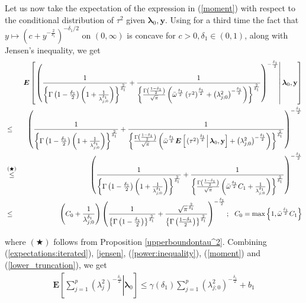 \documentclass[noinfoline,11pt]{imsart}
\numberwithin{equation}{section}
\theoremstyle{plain}
\newcommand{\bl}{\boldsymbol{\lambda}}
\newcommand{\E}{\boldsymbol{E}}
\begin{document}
  \noindent
  Let us now take the expectation of the expression in (\ref{moment}) with respect to the conditional distribution of $\tau^2$ given $\mathbf{\bl}_0, \mathbf{y}$. Using for a third time the fact that $y\mapsto\left(c+y^{-\frac{2}{\delta_1}}\right)^{-\delta_1/2}$ on $(0,\infty)$ is concave for $c > 0, \delta_1 \in (0,1)$, along with  Jensen's inequality, we get
  \begin{eqnarray}
   & & \E\left[\left.\left(\frac{1}{\left\{\Gamma\left(1-\frac{\delta_1}{2}\right)\left(1+\frac{1}{\lambda_{j;0}^{\delta_1}}\right)\right\}^{\frac{2}{\delta_1}}}+\frac{1}{\left\{\frac{\Gamma\left(\frac{1-\delta_1}{2}\right)}{\sqrt{\pi}}\left(\bar{\omega}^{\frac{\delta_1}{2}}\left(\tau^2\right)^{\frac{\delta_1}{2}}+\left(\lambda_{j;0}^2\right)^{-\frac{\delta_1}{2}}\right)\right\}^{\frac{2}{\delta_1}}}\right)^{-\frac{\delta_1}{2}}\right|\mathbf{\bl}_0,\mathbf{y}\right] \nonumber \\
   &\leq& \left(\frac{1}{\left\{\Gamma\left(1-\frac{\delta_1}{2}\right)\left(1+\frac{1}{\lambda_{j;0}^{\delta_1}}\right)\right\}^{\frac{2}{\delta_1}}}+\frac{1}{\left\{\frac{\Gamma\left(\frac{1-\delta_1}{2}\right)}{\sqrt{\pi}}\left(\bar{\omega}^{\frac{\delta_1}{2}}\E\left[\left.\left(\tau^2\right)^{\frac{\delta_1}{2}}\right|\mathbf{\bl}_0,\mathbf{y}\right]+\left(\lambda_{j;0}^2\right)^{-\frac{\delta_1}{2}}\right)\right\}^{\frac{2}{\delta_1}}}\right)^{-\frac{\delta_1}{2}} \nonumber \allowdisplaybreaks\\
   &\overset{(\bigstar)}{\leq}&  \left(\frac{1}{\left\{\Gamma\left(1-\frac{\delta_1}{2}\right)\left(1+\frac{1}{\lambda_{j;0}^{\delta_1}}\right)\right\}^{\frac{2}{\delta_1}}}+\frac{1}{\left\{\frac{\Gamma\left(\frac{1-\delta_1}{2}\right)}{\sqrt{\pi}}\left(\bar{\omega}^{\frac{\delta_1}{2}}C_1+\frac{1}{\lambda_{j;0}^{\delta_1}}\right)\right\}^{\frac{2}{\delta_1}}}\right)^{-\frac{\delta_1}{2}} \nonumber \\
  &\leq& \left(C_0+\frac{1}{\lambda_{j;0}^{\delta_1}}\right)\left(\frac{1}{\left\{\Gamma\left(1-\frac{\delta_1}{2}\right)\right\}^{\frac{2}{\delta_1}}}+\frac{\sqrt{\pi}^{\frac{2}{\delta_1}}}{\left\{\Gamma\left(\frac{1-\delta_1}{2}\right)\right\}^{\frac{2}{\delta_1}}}\right)^{-\frac{\delta_1}{2}};\ \ C_0=\text{max}\left\{1,\bar{\omega}^{\frac{\delta_1}{2}}C_1\right\} \label{lower_truncation}
\end{eqnarray}

\noindent
where $(\bigstar)$ follows from Proposition \ref{upperboundontau^2}. Combining (\ref{expectations:iterated}), \eqref{jensen},  (\ref{power:inequality}), 
(\ref{moment}) and (\ref{lower_truncation}), we get 
\begin{eqnarray}\label{drift:1}
   \E\left[\left.\sum_{j=1}^p\left(\lambda_j^2\right)^{-\frac{\delta_1}{2}}\right|\mathbf{\bl}_0\right]\leq \gamma\left(\delta_1\right)\sum_{j=1}^p\left(\lambda_{j;0}^2\right)^{-\frac{\delta_1}{2}}+b_1
\end{eqnarray}
\end{document}
